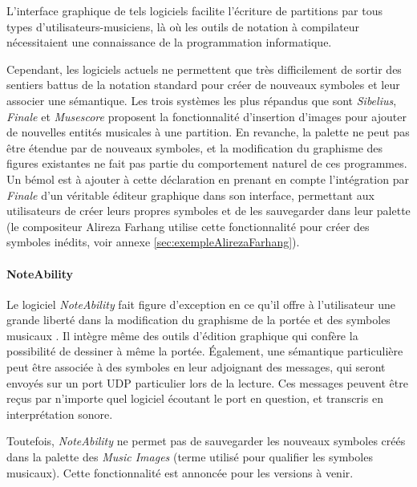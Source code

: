 L'interface graphique de tels logiciels facilite l'écriture de partitions par tous types d'utilisateurs-musiciens, là où les outils de notation à compilateur nécessitaient une connaissance de la programmation informatique.

Cependant, les logiciels actuels ne permettent que très difficilement de sortir des sentiers battus de la notation standard pour créer de nouveaux symboles et leur associer une sémantique. Les trois systèmes les plus répandus que sont \textit{Sibelius}, \textit{Finale} et \textit{Musescore} proposent la fonctionnalité d'insertion d'images pour ajouter de nouvelles entités musicales à une partition. En revanche, la palette ne peut pas être étendue par de nouveaux symboles, et la modification du graphisme des figures existantes ne fait pas partie du comportement naturel de ces programmes. Un bémol est à ajouter à cette déclaration en prenant en compte l'intégration par \textit{Finale} d'un véritable éditeur graphique dans son interface, permettant aux utilisateurs de créer leurs propres symboles et de les sauvegarder dans leur palette (le compositeur Alireza Farhang utilise cette fonctionnalité pour créer des symboles inédits, voir annexe \ref{sec:exempleAlirezaFarhang}).

\paragraph{NoteAbility} Le logiciel \textit{NoteAbility} fait figure d'exception en ce qu'il offre à l'utilisateur une grande liberté dans la modification du graphisme de la portée et des symboles musicaux \cite{noteAbility2018}.
Il intègre même des outils d'édition graphique qui confère la possibilité de dessiner à même la portée.
Également, une sémantique particulière peut être associée à des symboles en leur adjoignant des messages, qui seront envoyés sur un port UDP particulier lors de la lecture. Ces messages peuvent être reçus par n'importe quel logiciel écoutant le port en question, et transcris en interprétation sonore.

Toutefois, \textit{NoteAbility} ne permet pas de sauvegarder les nouveaux symboles créés dans la palette des \textit{Music Images} (terme utilisé pour qualifier les symboles musicaux). Cette fonctionnalité est annoncée pour les versions à venir.      